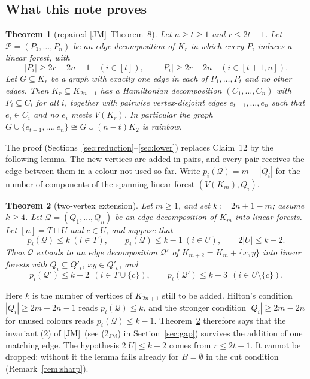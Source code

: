 \documentclass[11pt]{amsart}
\newtheorem{thmL}{Theorem}
\theoremstyle{definition}
\theoremstyle{remark}
\newcommand{\Q}{\mathcal{Q}}
\newcommand{\PP}{\mathcal{P}}
\newcommand{\JM}{\textup{[JM]}}
\begin{document}
\subsection*{What this note proves}
\begin{thmL}[repaired \JM\ Theorem~8]\label{thmA}
Let $n\ge t\ge1$ and $r\le 2t-1$. Let $\PP=(P_1,\dots,P_n)$ be an edge decomposition of
$K_r$ in which every $P_i$ induces a linear forest, with
\[
|P_i|\ge 2r-2n-1\quad(i\in[t]),\qquad |P_i|\ge 2r-2n\quad(i\in[t+1,n]).
\]
Let $G\subseteq K_r$ be a graph with exactly one edge in each of $P_1,\dots,P_t$ and no other
edges. Then $K_r\subseteq K_{2n+1}$ has a Hamiltonian decomposition $(C_1,\dots,C_n)$ with
$P_i\subseteq C_i$ for all $i$, together with pairwise vertex-disjoint edges
$e_{t+1},\dots,e_n$ such that $e_i\in C_i$ and no $e_i$ meets $V(K_r)$. In particular the graph
$G\cup\{e_{t+1},\dots,e_n\}\cong G\cup(n-t)K_2$ is rainbow.
\end{thmL}

The proof (Sections~\ref{sec:reduction}--\ref{sec:lower}) replaces Claim~12 by the following
lemma. The new vertices are added in pairs, and every pair receives the edge between them in a
colour not used so far. Write $p_i(\Q)=m-|Q_i|$ for the number of components of the spanning
linear forest $(V(K_m),Q_i)$.

\begin{thmL}[two-vertex extension]\label{thmB}
Let $m\ge1$, and set $k:=2n+1-m$; assume $k\ge4$. Let $\Q=(Q_1,\dots,Q_n)$ be an edge
decomposition of $K_m$ into linear forests. Let $[n]=T\sqcup U$ and $c\in U$, and suppose that
\[
p_i(\Q)\le k\ (i\in T),\qquad p_i(\Q)\le k-1\ (i\in U),\qquad 2|U|\le k-2 .
\]
Then $\Q$ extends to an edge decomposition $\Q'$ of $K_{m+2}=K_m+\{x,y\}$ into linear forests
with $Q_i\subseteq Q'_i$, $xy\in Q'_c$, and
\[
p_i(\Q')\le k-2\ \ (i\in T\cup\{c\}),\qquad p_i(\Q')\le k-3\ \ (i\in U\setminus\{c\}).
\]
\end{thmL}

Here $k$ is the number of vertices of $K_{2n+1}$ still to be added. Hilton's condition
$|Q_i|\ge 2m-2n-1$ reads $p_i(\Q)\le k$, and the stronger condition $|Q_i|\ge 2m-2n$ for unused
colours reads $p_i(\Q)\le k-1$. Theorem~\ref{thmB} therefore says that the invariant (2) of
\JM\ (see (2$_{\mathrm{JM}}$) in Section~\ref{sec:gap}) survives the addition of one matching edge. The hypothesis $2|U|\le k-2$ comes from
$r\le 2t-1$. It cannot be dropped: without it the lemma fails already for $B=\emptyset$ in the
cut condition (Remark~\ref{rem:sharp}).
\end{document}
